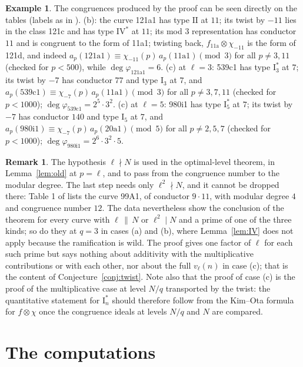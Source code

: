 \documentclass[11pt]{amsart}
\theoremstyle{definition}
\newtheorem{remark}[theorem]{Remark}
\newtheorem{example}[theorem]{Example}
\begin{document}
\begin{example}
The congruences produced by the proof can be seen directly on the tables (labels as in \cite{Cremona97}). (b): the curve 121a1 has type $\mathrm{II}$ at $11$; its twist by $-11$ lies in the class 121c and has type $\mathrm{IV}^*$ at $11$; its mod $3$ representation has conductor $11$ and is congruent to the form of 11a1; twisting back, $f_{\text{11a}}\otimes\chi_{-11}$ is the form of 121d, and indeed $a_p(\text{121a1})\equiv\chi_{-11}(p)\,a_p(\text{11a1})\pmod 3$ for all $p\ne3,11$ (checked for $p<500$), while $\deg\varphi_{\text{121a1}}=6$. (c) at $\ell=3$: 539c1 has type $\mathrm{I}_3^*$ at $7$; its twist by $-7$ has conductor $77$ and type $\mathrm{I}_3$ at $7$, and $a_p(\text{539c1})\equiv\chi_{-7}(p)\,a_p(\text{11a1})\pmod3$ for all $p\ne3,7,11$ (checked for $p<1000$); $\deg\varphi_{\text{539c1}}=2^5\cdot3^2$. (c) at $\ell=5$: 980i1 has type $\mathrm{I}_5^*$ at $7$; its twist by $-7$ has conductor $140$ and type $\mathrm{I}_5$ at $7$, and $a_p(\text{980i1})\equiv\chi_{-7}(p)\,a_p(\text{20a1})\pmod5$ for all $p\ne2,5,7$ (checked for $p<1000$); $\deg\varphi_{\text{980i1}}=2^6\cdot3^2\cdot5$.
\end{example}

\begin{remark}
The hypothesis $\ell\nmid N$ is used in the optimal-level theorem, in Lemma~\ref{lem:old} at $p=\ell$, and to pass from the congruence number to the modular degree. The last step needs only $\ell^2\nmid N$, and it cannot be dropped there: Table 1 of \cite{ARS12} lists the curve 99A1, of conductor $9\cdot11$, with modular degree $4$ and congruence number $12$. The data nevertheless show the conclusion of the theorem for every curve with $\ell\,\|\,N$ or $\ell^2\mid N$ and a prime of one of the three kinds; so do they at $q=3$ in cases (a) and (b), where Lemma~\ref{lem:IV} does not apply because the ramification is wild. The proof gives one factor of $\ell$ for each such prime but says nothing about additivity with the multiplicative contributions or with each other, nor about the full $v_\ell(n)$ in case (c); that is the content of Conjecture~\ref{conj:twist}. Note also that the proof of case (c) is the proof of the multiplicative case at level $N/q$ transported by the twist: the quantitative statement for $\mathrm{I}_n^*$ should therefore follow from the Kim--Ota formula for $f\otimes\chi$ once the congruence ideals at levels $N/q$ and $N$ are compared.
\end{remark}

\section{The computations}\label{sec:data}
\end{document}
